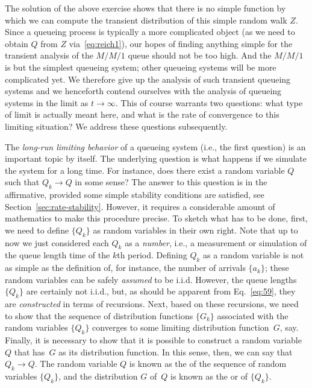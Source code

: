 The solution of the above exercise shows that there is no simple
function by which we can compute the transient distribution of 
this simple random walk $Z$. Since a queueing process is typically a
more complicated object (as we need to obtain $Q$ from $Z$ via~\eqref{eq:reich1}), our
hopes of finding anything simple for the transient analysis of the
$M/M/1$ queue should not be too high. And the $M/M/1$ is but the
simplest queueing system; other queueing systems will be more
complicated yet.  We therefore give up the analysis of such transient
queueing systems and we henceforth contend ourselves with the analysis
of queueing systems in the limit as $t\to\infty$.  This of course
warrants two questions: what type of limit is actually meant here, and
what is the rate of convergence to this limiting situation? We address
these questions subsequently.

The \emph{long-run limiting behavior} of a queueing system (i.e., the first question) is an
important topic by itself. The underlying question is what happens if
we simulate the system for a long time. For instance, does there exist
a random variable $Q$ such that $Q_k\to Q$ in some sense? The answer
to this question is in the affirmative, provided some simple stability
conditions are satisfied, see
Section~\ref{sec:rate-stability}. However, it requires a considerable
amount of mathematics to make this procedure precise. To sketch what
has to be done, first, we need to define $\{Q_k\}$ as random variables
in their own right. Note that up to now we just considered each $Q_k$
as a \emph{number}, i.e., a measurement or simulation of the queue
length time of the $k$th period. Defining $Q_k$ as a random variable
is not as simple as the definition of, for instance, the number of
arrivals $\{a_k\}$; these random variables can be safely
\emph{assumed} to be i.i.d. However, the queue lengths $\{Q_k\}$ are
certainly not i.i.d., but, as should be apparent from
Eq.~\eqref{eq:59}, they are \emph{constructed} in terms of
recursions. Next, based on these recursions, we need to show that the
sequence of distribution functions $\{G_k\}$ associated with the
random variables $\{Q_k\}$ converges to some limiting distribution
function~$G$, say. Finally, it is necessary to show that it is
possible to construct a random variable~$Q$ that has~$G$ as its
distribution function.  In this sense, then, we can say
that~$Q_k \to Q$. The random variable $Q$ is known as the
 of the sequence of random variables
$\{Q_k\}$, and the distribution $G$ of~$Q$ is known as the
 or  of $\{Q_k\}$.

